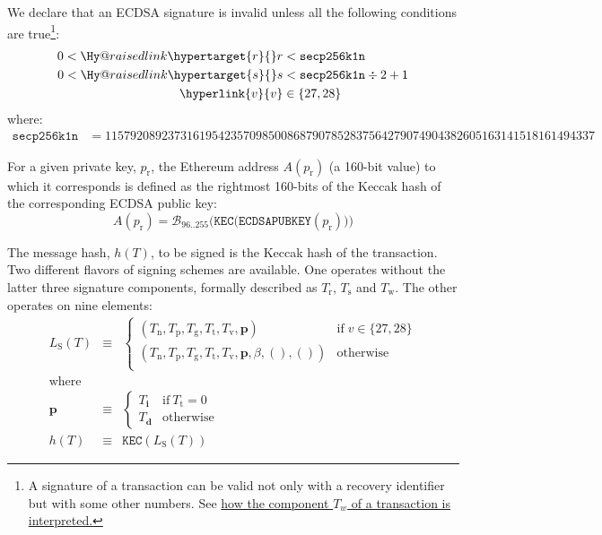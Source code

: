 \documentclass[9pt,oneside]{amsart}
\makeatletter
\newcommand{\linkdest}[1]{\Hy@raisedlink{\hypertarget{#1}{}}}
\makeatother
\begin{document}
\linkdest{invalidsig}We declare that an ECDSA signature is invalid unless all the following conditions are true\footnote{A signature of a transaction can be valid not only with a recovery identifier but with some other numbers.  See \hyperlink{T__w}{how the component $T_w$ of a transaction is interpreted.}}:
\begin{align}
0 < \linkdest{r}{r} &< \mathtt{secp256k1n} \\
0 < \linkdest{s}{s} &< \mathtt{secp256k1n} \div 2 + 1 \\
\hyperlink{v}{v} &\in \{27,28\}
\end{align}
where:
\begin{align}
\mathtt{secp256k1n} &= 115792089237316195423570985008687907852837564279074904382605163141518161494337
\end{align}

For a given private key, $p_{\mathrm{r}}$, the Ethereum address $A(p_{\mathrm{r}})$ (a 160-bit value) to which it corresponds is defined as the rightmost 160-bits of the Keccak hash of the corresponding ECDSA public key:
\begin{equation}
A(p_{\mathrm{r}}) = \mathcal{B}_{96..255}\big(\mathtt{KEC}\big( \mathtt{ECDSAPUBKEY}(p_{\mathrm{r}}) \big) \big)
\end{equation}

\hypertarget{h_of_T}{}The message hash, $h(T)$, to be signed is the Keccak hash of the transaction. Two different flavors of signing schemes are available. One operates without the latter three signature components, formally described as $T_{\mathrm{r}}$, $T_{\mathrm{s}}$ and $T_{\mathrm{w}}$. The other operates on nine elements:
\begin{eqnarray}
L_{\mathrm{S}}(T) & \equiv & \begin{cases}
(T_{\mathrm{n}}, T_{\mathrm{p}}, T_{\mathrm{g}}, T_{\mathrm{t}}, T_{\mathrm{v}}, \mathbf{p}) & \text{if} \; v \in \{27, 28\} \\
(T_{\mathrm{n}}, T_{\mathrm{p}}, T_{\mathrm{g}}, T_{\mathrm{t}}, T_{\mathrm{v}}, \mathbf{p}, \beta, (), ()) & \text{otherwise} \\
\end{cases} \\
\nonumber \text{where} \\
\nonumber \mathbf{p} & \equiv & \begin{cases}
T_{\mathbf{i}} & \text{if}\ T_{\mathrm{t}} = 0 \\
T_{\mathbf{d}} & \text{otherwise}
\end{cases} \\
h(T) & \equiv & \mathtt{KEC}( L_{\mathrm{S}}(T) )
\end{eqnarray}
\end{document}
